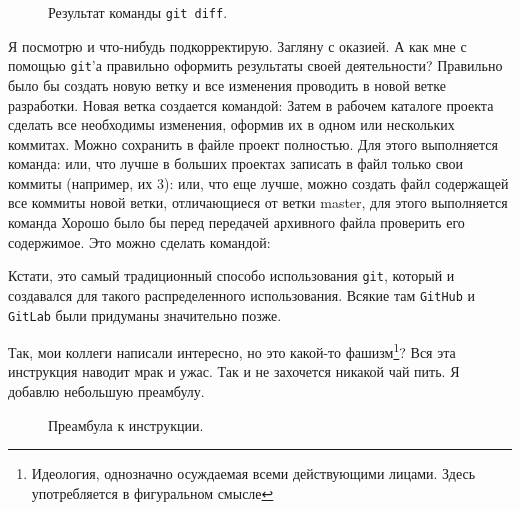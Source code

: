 \documentclass[14pt,a4paper]{article}
\begin{document}
\begin{figure}
	\centering
	\caption{Результат команды \texttt{git diff}.}
	\label{pic-diff-result}
\end{figure}

 Я посмотрю и что-нибудь подкорректирую. Загляну с оказией. 
А как мне с помощью \texttt{git}'а правильно оформить результаты своей деятельности?
 Правильно было бы создать новую ветку и все изменения проводить 
в новой ветке разработки. Новая ветка создается командой:
Затем в рабочем каталоге проекта сделать все необходимы изменения, оформив их в одном
или нескольких коммитах. Можно сохранить в файле проект полностью. Для этого выполняется 
команда:
или, что лучше в больших проектах записать в файл только свои коммиты (например, их 3):
или, что еще лучше, можно создать файл содержащей все коммиты новой ветки, отличающиеся от ветки
master, для этого выполняется команда
Хорошо было бы перед передачей архивного файла проверить его содержимое. Это можно сделать 
командой:

Кстати, это самый традиционный способо использования \texttt{git}, который и создавался
для такого распределенного использования. Всякие там \texttt{GitHub} и \texttt{GitLab}
были придуманы значительно позже.

 Так, мои коллеги написали интересно, но это какой-то
фашизм\footnote{Идеология, однозначно осуждаемая всеми действующими лицами. Здесь употребляется в
фигуральном смысле}? Вся эта инструкция наводит мрак и ужас. Так и не захочется никакой чай пить.
Я добавлю небольшую преамбулу.

\begin{figure}
	\centering
	\caption{Преамбула к инструкции.}
	\label{listing-preambula}
\end{figure}


\end{document}
